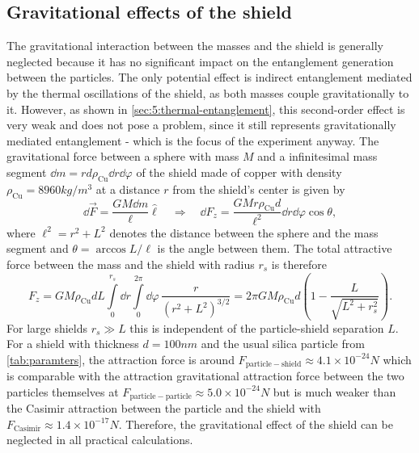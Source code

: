 \subsection{Gravitational effects of the shield}\label{subsec:5:shield-gravitation}
The gravitational interaction between the masses and the shield is generally neglected because it has no significant impact on the entanglement generation between the particles.
The only potential effect is indirect entanglement mediated by the thermal oscillations of the shield, as both masses couple gravitationally to it. 
However, as shown in \cref{sec:5:thermal-entanglement}, this second-order effect is very weak and does not pose a problem, since it still represents gravitationally mediated entanglement - which is the focus of the experiment anyway.
The gravitational force between a sphere with mass $M$ and a infinitesimal mass segment $\dd m = r d \rho_\mathrm{Cu} \dd r \dd \varphi$ of the shield made of copper with density $\rho_\mathrm{Cu} = 8960\si{kg/m^3}$ at a distance $r$ from the shield's center is given by
\begin{equation}
  \dd \vec{F} = \frac{G M \dd m}{\ell} \boldsymbol{\hat{\ell}} 
  \quad \Rightarrow \quad
  \dd F_z = \frac{G M r \rho_\mathrm{Cu} d}{\ell^2} \dd r \dd \varphi \cos \theta,
\end{equation}
where $\ell^2 = r^2 + L^2$ denotes the distance between the sphere and the mass segment and $\theta = \arccos L/\ell$ is the angle between them.
The total attractive force between the mass and the shield with radius $r_s$ is therefore
\begin{equation}
  F_z = GM \rho_\mathrm{Cu} d L \int\limits_{0}^{r_s} \dd r \int\limits_{0}^{2\pi} \dd \varphi \, \frac{r}{(r^2 + L^2)^{3/2}} = 2\pi G M \rho_\mathrm{Cu} d \left(1 - \frac{L}{\sqrt{L^2 + r_s^2}}\right) .
\end{equation}
For large shields $r_s \gg L$ this is independent of the particle-shield separation $L$.
For a shield with thickness $d = 100\si{nm}$ and the usual silica particle from \cref{tab:paramters}, the attraction force is around $F_\mathrm{particle-shield} \approx 4.1\times 10^{-24} \si{N}$ which is comparable with the attraction gravitational attraction force between the two particles themselves at $F_\mathrm{particle-particle} \approx 5.0 \times 10^{-24}\si{N}$ but is much weaker than the Casimir attraction between the particle and the shield with $F_\mathrm{Casimir} \approx 1.4 \times 10^{-17} \si{N}$.
Therefore, the gravitational effect of the shield can be neglected in all practical calculations.